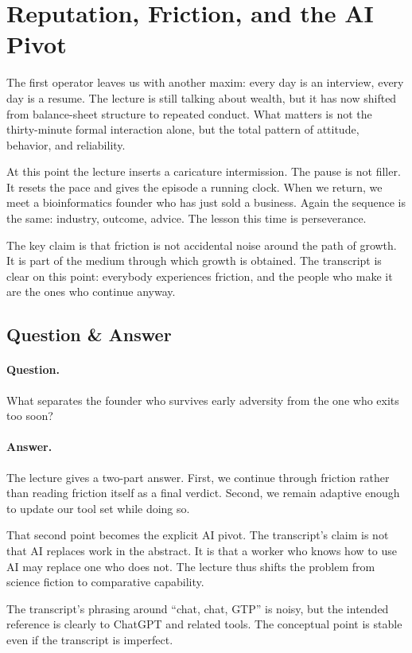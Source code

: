 \section{Reputation, Friction, and the AI Pivot}

The first operator leaves us with another maxim: every day is an interview, every day is a resume. The lecture is still talking about wealth, but it has now shifted from balance-sheet structure to repeated conduct. What matters is not the thirty-minute formal interaction alone, but the total pattern of attitude, behavior, and reliability.

At this point the lecture inserts a caricature intermission. The pause is not filler. It resets the pace and gives the episode a running clock. When we return, we meet a bioinformatics founder who has just sold a business. Again the sequence is the same: industry, outcome, advice. The lesson this time is perseverance.

The key claim is that friction is not accidental noise around the path of growth. It is part of the medium through which growth is obtained. The transcript is clear on this point: everybody experiences friction, and the people who make it are the ones who continue anyway.

\subsection{Question \& Answer}

\paragraph{Question.} What separates the founder who survives early adversity from the one who exits too soon?

\paragraph{Answer.} The lecture gives a two-part answer. First, we continue through friction rather than reading friction itself as a final verdict. Second, we remain adaptive enough to update our tool set while doing so.

That second point becomes the explicit AI pivot. The transcript's claim is not that AI replaces work in the abstract. It is that a worker who knows how to use AI may replace one who does not. The lecture thus shifts the problem from science fiction to comparative capability.

\begin{remark}
The transcript's phrasing around ``chat, chat, GTP'' is noisy, but the intended reference is clearly to ChatGPT and related tools. The conceptual point is stable even if the transcript is imperfect.
\end{remark}

